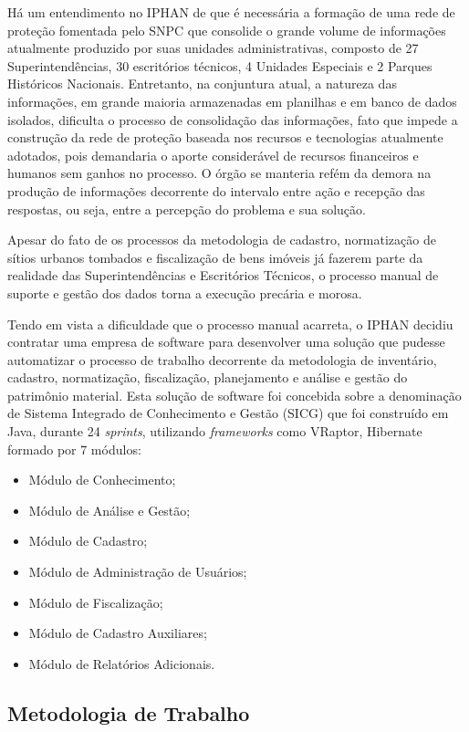 Há um entendimento no IPHAN de que é necessária a formação de uma rede de proteção fomentada pelo SNPC que consolide o grande volume de informações atualmente produzido por suas unidades administrativas, composto de 27 Superintendências, 30 escritórios técnicos, 4 Unidades Especiais e 2 Parques Históricos Nacionais. Entretanto, na conjuntura atual, a natureza das informações, em grande maioria armazenadas em planilhas e em banco de dados isolados, dificulta o processo de consolidação das informações, fato 
que impede a construção da rede de proteção baseada nos recursos e tecnologias atualmente adotados, pois demandaria o aporte considerável de recursos financeiros e humanos sem ganhos no processo. O órgão se manteria refém da demora na produção de informações decorrente do intervalo entre ação e recepção das respostas, ou seja, entre a percepção do problema e sua solução.

Apesar do fato de os processos da metodologia de cadastro, normatização de sítios urbanos tombados e fiscalização de bens imóveis já fazerem parte da realidade das Superintendências e Escritórios Técnicos, o processo manual de suporte e gestão dos dados torna a execução precária e morosa.

Tendo em vista a dificuldade que o processo manual acarreta, o IPHAN decidiu contratar uma empresa de software para desenvolver uma solução que pudesse automatizar o processo de trabalho decorrente da metodologia de inventário, cadastro, normatização, fiscalização, planejamento e análise e gestão do patrimônio material. Esta solução de software foi concebida sobre a denominação de Sistema Integrado de Conhecimento e Gestão (SICG) que foi construído em Java, durante 24 \textit{sprints}, utilizando \textit{frameworks} como VRaptor, Hibernate formado por 7 módulos:

\begin{itemize}
\item Módulo de Conhecimento;
\item Módulo de Análise e Gestão;
\item Módulo de Cadastro;
\item Módulo de Administração de Usuários;
\item Módulo de Fiscalização;
\item Módulo de Cadastro Auxiliares;
\item Módulo de Relatórios Adicionais.
\end{itemize}


\subsection{Metodologia de Trabalho}


